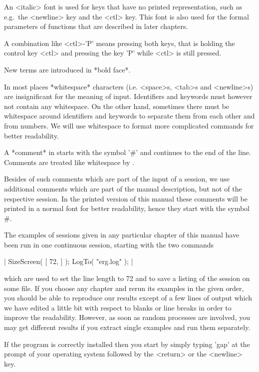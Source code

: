 An  <italic>  font is used for keys that have no printed  representation,
such as e.g.\  the <newline> key and the <ctl>  key.   This  font is also
used for the formal parameters of functions  that  are described in later
chapters.

A combination  like <ctl>-'P' means pressing both keys,  that is  holding
the  control key  <ctl> and pressing  the key  'P'  while <ctl> is  still
pressed.

New terms are introduced in *bold face*.

In  most  places  *whitespace*  characters  (i.e.   <space>s, <tab>s  and
<newline>s)   are  insignificant  for  the   meaning  of   {\GAP}  input.
Identifiers and keywords must however not contain any whitespace.  On the
other  hand,  sometimes there  must be whitespace around identifiers  and
keywords to separate them from each other and from numbers.  We  will use
whitespace to format more complicated commands for better readability.

A *comment* in {\GAP} starts  with  the  symbol '\#' and continues to the
end of the line.  Comments are treated like whitespace by {\GAP}.

Besides of such comments which are part of the input of a {\GAP} session,
we use additional comments  which are part of the manual description, but
not  of the  respective {\GAP} session.  In the  printed version  of this
manual  these comments  will  be printed  in  a normal  font  for  better
readability, hence they start with the symbol \#.

The examples of  {\GAP} sessions given  in any particular chapter of this
manual have been  run in one continuous   session, starting with the  two
commands

|    SizeScreen( [ 72, ] );
    LogTo( "erg.log" ); |

which are used to set the line length to 72 and  to save a listing of the
session on some file.  If  you choose any chapter  and rerun its examples
in the given order, you should be able to reproduce our results except of
a few lines of output which we  have edited a  little bit with respect to
blanks or line  breaks in order to  improve the readability.  However, as
soon as  random processes are involved, you  may get different results if
you extract single examples and run them separately.


If the  program  is correctly installed then  you start {\GAP}  by simply
typing 'gap'  at  the prompt  of your  operating  system  followed by the
<return> or the <newline> key.

